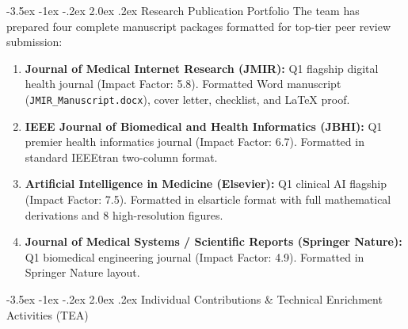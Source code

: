 \documentclass[11pt, a4paper]{article}
\makeatletter
\renewcommand\section{\@startsection {section}{1}{\z@}%
                                   {-3.5ex \@plus -1ex \@minus -.2ex}%
                                   {2.0ex \@plus.2ex}%
                                   {\normalfont\large\bfseries\color{amritaMaroon}}}
\makeatother
\begin{document}
\section{Research Publication Portfolio}
The team has prepared four complete manuscript packages formatted for top-tier peer review submission:
\begin{enumerate}
    \item \textbf{Journal of Medical Internet Research (JMIR):} Q1 flagship digital health journal (Impact Factor: 5.8). Formatted Word manuscript (\texttt{JMIR\_Manuscript.docx}), cover letter, checklist, and LaTeX proof.
    \item \textbf{IEEE Journal of Biomedical and Health Informatics (JBHI):} Q1 premier health informatics journal (Impact Factor: 6.7). Formatted in standard IEEEtran two-column format.
    \item \textbf{Artificial Intelligence in Medicine (Elsevier):} Q1 clinical AI flagship (Impact Factor: 7.5). Formatted in elsarticle format with full mathematical derivations and 8 high-resolution figures.
    \item \textbf{Journal of Medical Systems / Scientific Reports (Springer Nature):} Q1 biomedical engineering journal (Impact Factor: 4.9). Formatted in Springer Nature layout.
\end{enumerate}

\section{Individual Contributions \& Technical Enrichment Activities (TEA)}
\end{document}
